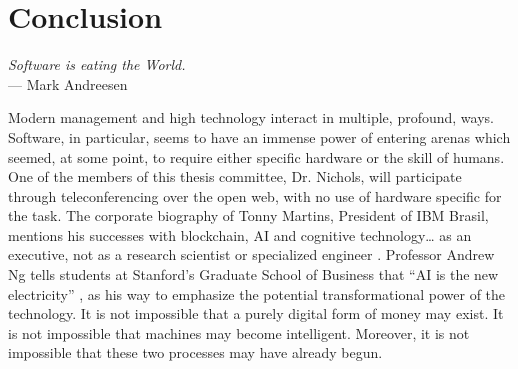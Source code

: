 \chapter{Conclusion}
\bigskip

\begin{flushright}{\slshape
	Software is eating the World.} \\ \medskip
    --- Mark Andreesen \citep{andreesen:2011}
\end{flushright}
\bigskip
\bigskip

\noindent Modern management and high technology interact in multiple, profound, ways.  Software, in particular, seems to have an immense power of entering arenas which seemed, at some point, to require either specific hardware or the skill of humans.  One of the members of this thesis committee, Dr. Nichols, will participate through teleconferencing over the open web, with no use of hardware specific for the task.  The corporate biography of Tonny Martins, President of IBM Brasil, mentions his successes with blockchain, AI and cognitive technology… as an executive, not as a research scientist or specialized engineer \citep{TonnyMartins}. Professor Andrew Ng tells students at Stanford’s Graduate School of Business that ``AI is the new electricity'' \citet{AndrewNgAI}, as his way to emphasize the potential transformational power of the technology.  It is not impossible that a purely digital form of money may exist.  It is not impossible that machines may become intelligent.  Moreover, it is not impossible that these two processes may have already begun.


